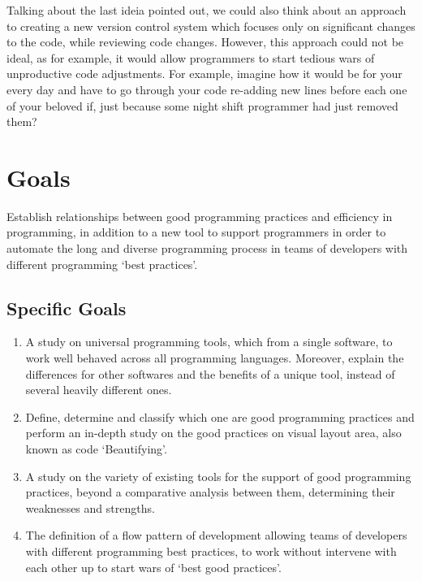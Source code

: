 \begin{englishtext}
    Talking about the last ideia pointed out, we could also think about an
    approach to creating a new version control system which focuses only on
    significant changes to the code, while reviewing code changes. However, this
    approach could not be ideal, as for example, it would allow programmers to
    start tedious wars of unproductive code adjustments. For example, imagine
    how it would be for your every day and have to go through your code
    re-adding new lines before each one of your beloved if\s, just because some
    night shift programmer had just removed them?



    \section{Goals}

    Establish relationships between good programming practices and efficiency in
    programming, in addition to a new tool to support programmers in order to
    automate the long and diverse programming process in teams of developers
    with different programming `best practices'. \cite{pushdownAutomata}


    \subsection{Specific Goals}

    \begin{enumerate}
        \item A study on universal programming tools, which from a single
        software, to work well behaved across all programming languages.
        Moreover, explain the differences for other softwares and the benefits
        of a unique tool, instead of several heavily different ones.

        \item Define, determine and classify which one are good programming
        practices and perform an in-depth study on the good practices on visual
        layout area, also known as code `Beautifying'.

        \item A study on the variety of existing tools for the support of good
        programming practices, beyond a comparative analysis between them,
        determining their weaknesses and strengths.

        \item The definition of a flow pattern of development allowing teams of
        developers with different programming best practices, to work without
        intervene with each other up to start wars of `best good practices'.


\end{enumerate}
\end{englishtext}
